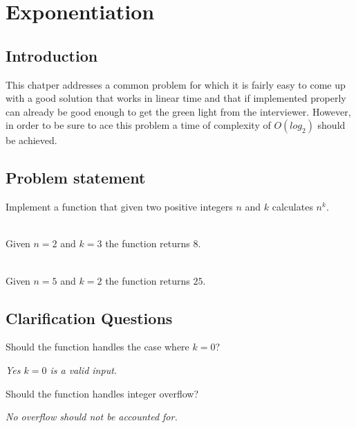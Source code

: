 %

\chapter{Exponentiation}
\label{ch:exponentiation}
\section*{Introduction}
This chatper addresses a common problem for which it is fairly easy to come up with a good solution that works in linear time and that if implemented properly can already be good enough to get the green light from the interviewer. However, in order to be sure to ace this problem a time of complexity of  $O(log_2)$ should be achieved.

\section{Problem statement}
\begin{exercise}
Implement a function that given two positive integers $n$ and $k$ calculates $n^k$.
\end{exercise}


\begin{example}
	\hfill \\
	Given $n=2$ and $k=3$ the function returns $8$.
\end{example}

\begin{example}
	\hfill \\
	Given $n=5$ and $k=2$ the function returns $25$.
\end{example}

\section{Clarification Questions}

\begin{QandA}
	\item Should the function handles the case where $k=0$?
	\begin{answered}
		\textit{Yes $k=0$ is a valid input.}
	\end{answered}
	
	\item Should the function handles integer overflow?
	\begin{answered}
		\textit{No overflow should not be accounted for. }
	\end{answered}
		
\end{QandA}

